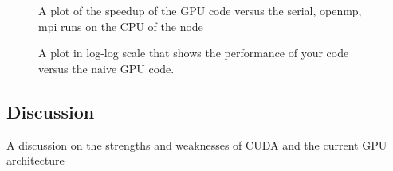 \documentclass[12pt]{article}
\begin{document}
\begin{figure}
  \caption{A plot of the speedup of the GPU code versus the serial, openmp, mpi runs on the CPU of the node}
  \label{fig:gpu-speedup}
\end{figure}

\begin{figure}
  \caption{A plot in log-log scale that shows the performance of your code versus the naive GPU code.}
  \label{fig:gpu-naive}
\end{figure}

\subsection{Discussion}

A discussion on the strengths and weaknesses of CUDA and the current GPU architecture


%
\end{document}
